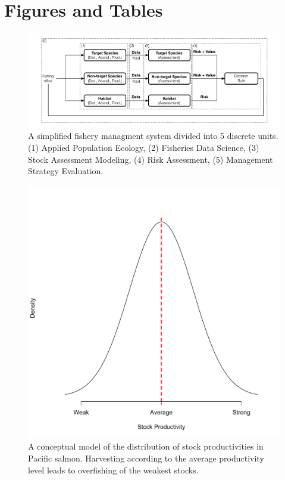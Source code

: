 \documentclass[]{scrartcl}
\author{}
\date{}
\begin{document}
\newpage

\section{Figures and Tables}\label{figures-and-tables}

\begin{landscape}
\begin{figure}[htbp]
\centering
\includegraphics{figures/mscMSE.pdf}
\caption{A simplified fishery managment system divided into 5 discrete units. (1) Applied Population Ecology, (2) Fisheries Data Science, (3) Stock Assessment Modeling, (4) Risk Assessment, (5) Management Strategy Evaluation.}\label{fig:fishMgmt}
\end{figure}
\end{landscape}

\newpage

\begin{figure}[htbp]
\centering
\includegraphics{figures/WeakStrongDist.pdf}
\caption{A conceptual model of the distribution of stock productivities in Pacific salmon. Harvesting according to the average productivity level leads to overfishing of the weakest stocks.}\label{fig:ppHCR}
\end{figure}
\end{document}
